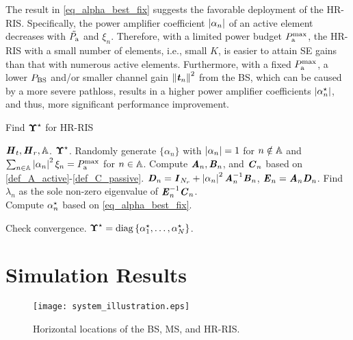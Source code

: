 \documentclass[conference]{IEEEtran}
\begin{document}
	\begin{remark}
		\label{remark}
		The result in \eqref{eq_alpha_best_fix} suggests the favorable deployment of the HR-RIS. Specifically, the power amplifier coefficient $\left|\alpha_n\right|$ of an active element decreases with $\tilde{P_{\mathrm{a}}}$ and $\xi_n$. Therefore, with a limited power budget $P_{\mathrm{a}}^{\mathrm{max}}$, the HR-RIS with a small number of elements, i.e., small $K$, is easier to attain SE gains than that with numerous active elements. Furthermore, with a fixed $P_{\mathrm{a}}^{\mathrm{max}}$, a lower $P_{\mathrm{BS}}$ and/or smaller channel gain $\left\lVert\textbf{\textit{t}}_n\right\rVert^2$ from the BS, which can be caused by a more severe pathloss, results in a higher power amplifier coefficients $\left|\alpha_n^{\star}\right|$, and thus, more significant performance improvement.
	\end{remark} 
	
	\begin{algorithm}[t]
		\caption{Find $\boldsymbol{\Upsilon}^{\star}$ for HR-RIS}
		\label{alg_fix}
		\begin{algorithmic}[1]
			\REQUIRE $\textbf{\textit{H}}_t, \textbf{\textit{H}}_r, \mathbb{A}$.
			\ENSURE $\boldsymbol{\Upsilon}^{\star}$.
			\STATE Randomly generate $\{\alpha_n\}$ with $\left|\alpha_n\right|=1$ for $n \notin \mathbb{A}$ and $\sum_{n \in \mathbb{A}} \left|\alpha_n\right|^2 \xi_n = P_{\mathrm{a}}^{\mathrm{max}}$ for $n \in \mathbb{A}$.
			\STATE Compute $\textbf{\textit{A}}_n, \textbf{\textit{B}}_n$, and $\textbf{\textit{C}}_n$ based on \eqref{def_A_active}-\eqref{def_C_passive}.
			\STATE $\textbf{\textit{D}}_n = \textbf{\textit{I}}_{N_r} + \left|\alpha_n\right|^2 \textbf{\textit{A}}_n^{-1}\textbf{\textit{B}}_n$, $\textbf{\textit{E}}_n = \textbf{\textit{A}}_n \textbf{\textit{D}}_n$.
			\STATE Find $\lambda_n$ as the sole non-zero eigenvalue of $\textbf{\textit{E}}_n^{-1}\textbf{\textit{C}}_n$.\\
			\STATE Compute $\alpha_n^{\star}$ based on \eqref{eq_alpha_best_fix}.
			\ENDFOR 
			
			\STATE Check convergence.
			\ENDWHILE
			\STATE $\boldsymbol{\Upsilon}^{\star} = \mathrm{diag}\left\{\alpha_1^{\star}, \ldots, \alpha_N^{\star}\right\}$.
		\end{algorithmic}
	\end{algorithm}
	
	
	
	
	
	
	\section{Simulation Results}
	\label{sec_sim}
	\begin{figure}[t]
		\centering
		\texttt{[image: system\_illustration.eps]}
		\caption{Horizontal locations of the BS, MS, and HR-RIS.}
		\label{fig_system_illustration}
	\end{figure}
	
\end{document}
